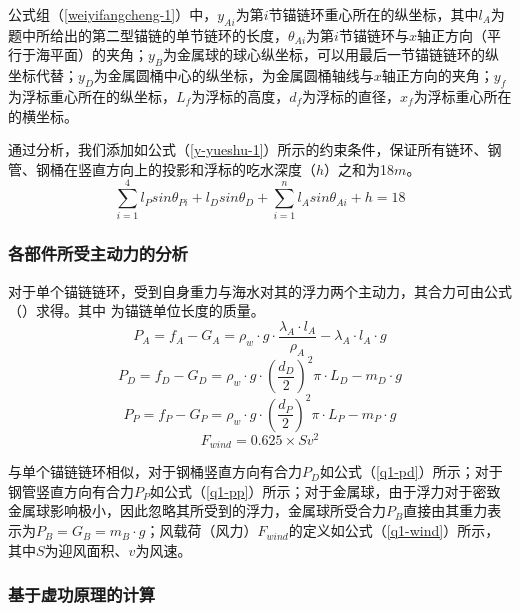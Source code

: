 \documentclass[withoutpreface,bwprint]{cumcmthesis} %
\begin{document}
\par 公式组（\ref{weiyifangcheng-1}）中，$y_{Ai}$为第$i$节锚链环重心所在的纵坐标，其中$l_A$为题中所给出的第二型锚链的单节链环的长度，$\theta_{Ai}$为第$i$节锚链环与$x$轴正方向（平行于海平面）的夹角；$y_B$为金属球的球心纵坐标，可以用最后一节锚链链环的纵坐标代替；$y_D$为金属圆桶中心的纵坐标，为金属圆桶轴线与$x$轴正方向的夹角；$y_f$为浮标重心所在的纵坐标，$L_f$为浮标的高度，$d_f$为浮标的直径，$x_f$为浮标重心所在的横坐标。
\par 通过分析，我们添加如公式（\ref{y-yueshu-1}）所示的约束条件，保证所有链环、钢管、钢桶在竖直方向上的投影和浮标的吃水深度（$h$）之和为18$m$。
\begin{equation}
	\label{y-yueshu-1}
	\sum\limits_{i=1}^{4} l_P sin \theta_{Pi} + l_D sin \theta_D + \sum\limits_{i=1}^{n} l_A sin \theta_{Ai} + h = 18
\end{equation}

\subsubsection{各部件所受主动力的分析}
\par 对于单个锚链链环，受到自身重力与海水对其的浮力两个主动力，其合力可由公式（）求得。其中 为锚链单位长度的质量。
\begin{equation}
	\label{q1-pa}
	P_A = f_A - G_A  = \rho_w \cdot g \cdot \frac{\lambda_A \cdot l_A}{\rho_A} - \lambda_A \cdot l_A \cdot g
\end{equation}
\begin{equation}
	\label{q1-pd}
	P_D = f_D -G_D = \rho_w \cdot g \cdot (\frac{d_D}{2})^2 \pi \cdot L_D - m_D \cdot g
\end{equation}
\begin{equation}
	\label{q1-pp}
	P_P = f_P -G_P = \rho_w \cdot g \cdot (\frac{d_P}{2})^2 \pi \cdot L_P - m_P \cdot g
\end{equation}
\begin{equation}
	\label{q1-wind}
	F_{wind} = 0.625 \times S v^2
\end{equation}
\par 与单个锚链链环相似，对于钢桶竖直方向有合力$P_D$如公式（\ref{q1-pd}）所示；对于钢管竖直方向有合力$P_P$如公式（\ref{q1-pp}）所示；对于金属球，由于浮力对于密致金属球影响极小，因此忽略其所受到的浮力，金属球所受合力$P_B$直接由其重力表示为$P_B = G_B = m_B \cdot g$；风载荷（风力）$F_{wind}$的定义如公式（\ref{q1-wind}）所示，其中$S$为迎风面积、$v$为风速。
\subsubsection{基于虚功原理的计算}
\end{document}
